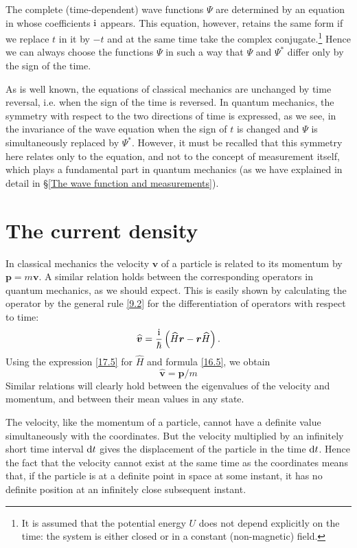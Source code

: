 The complete (time-dependent) wave functions $\Psi$ are determined by an equation in whose coefficients $ \mathrm{i} $ appears. This equation, however, retains the same form if we replace $ t $ in it by $ -t $ and at the same time take the complex conjugate.\footnote{It is assumed that the potential energy $ U $ does not depend explicitly on the time: the system is either closed or in a constant (non-magnetic) field.} Hence we can always choose the functions $\Psi$ in such a way that $\Psi$ and $\Psi^*$ differ only by the sign of the time.

As is well known, the equations of classical mechanics are unchanged by time reversal, i.e. when the sign of the time is reversed. In quantum mechanics, the symmetry with respect to the two directions of time is expressed, as we see, in the invariance of the wave equation when the sign of $ t $ is changed and $\Psi$ is simultaneously replaced by $\Psi^*$. However, it must be recalled that this symmetry here relates only to the equation, and not to the concept of measurement itself, which plays a fundamental part in quantum mechanics (as we have explained in detail in \S\ref{The wave function and measurements}).

\section{The current density}\label{The current density}
In classical mechanics the velocity $ \bm{v} $ of a particle is related to its momentum by $ \bm{p}=m\bm{v} $. A similar relation holds between the corresponding operators in quantum mechanics, as we should expect. This is easily shown by calculating the operator by the general rule \eqref{9.2} for the differentiation of operators with respect to time:
\[ \widehat{\bm{v}}=\frac{\mathrm{i}}{\hbar}\left( \widehat{H}\bm{r}-\bm{r}\widehat{H}\right). \]
Using the expression \eqref{17.5} for $\hat{H}$ and formula \eqref{16.5}, we obtain
\begin{equation}\label{19.1}
\hat{\bm{v}}=\bm{p}/m
\end{equation}
Similar relations will clearly hold between the eigenvalues of the velocity and momentum, and between their mean values in any state.

The velocity, like the momentum of a particle, cannot have a definite value simultaneously with the coordinates. But the velocity multiplied by an infinitely short time interval $ \mathrm{d} t $ gives the displacement of the particle in the time $ \mathrm{d} t $. Hence the fact that the velocity cannot exist at the same time as the coordinates means that, if the particle is at a definite point in space at some instant, it has no definite position at an infinitely close subsequent instant.

